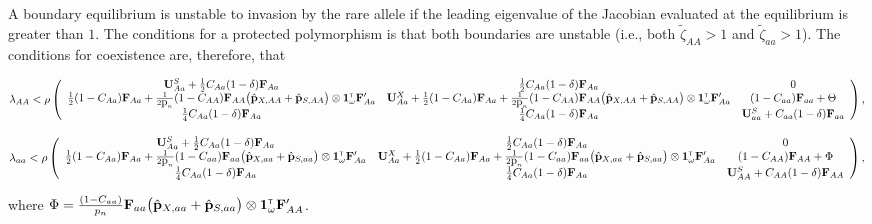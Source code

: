 \documentclass[11pt]{article}
\def\mbf#1{\mathbf{#1}}
\newcommand{\tr}{{\mbox{\tiny \sf T}}}
\begin{document}
\begin{landscape}
A boundary equilibrium is unstable to invasion by the rare allele if the leading eigenvalue of the Jacobian evaluated at the equilibrium is greater than $1$. The conditions for a protected polymorphism is that both boundaries are unstable (i.e., both $\tilde{\zeta}_{AA} > 1$ and $\tilde{\zeta}_{aa} > 1$). The conditions for coexistence are, therefore, that


{\footnotesize
\begin{equation} \label{eq:coexist_AA}
	\lambda_{AA} < 
			\rho\left(\begin{array}{ccc}
\mathbf{U}^S_{Aa} +\frac{1}{2} C_{Aa} (1 - \delta) \mbf{F}_{Aa} & \frac{1}{2} C_{Aa} (1 - \delta) \mbf{F}_{Aa}  & 0 \\
 \frac{1}{2} (1 - C_{Aa}) \mbf{F}_{Aa}+\frac{1}{2  \mbox{p}_{n}} (1 - C_{AA})\mbf{F}_{AA} \big(\hat{\mbf{p}}_{X,AA}+ \hat{\mbf{p}}_{S,AA}  \big) \otimes \mathbf{1}^\tr_{\omega} \mathbf{F}_{Aa}^\prime &\mathbf{U}^X_{Aa} + \frac{1}{2} (1 - C_{Aa}) \mbf{F}_{Aa} +\frac{1}{2  \mbox{p}_{n}} (1 - C_{AA})\mbf{F}_{AA} \big(\hat{\mbf{p}}_{X,AA}+ \hat{\mbf{p}}_{S,AA}  \big) \otimes \mathbf{1}^\tr_{\omega} \mathbf{F}_{Aa}^\prime & (1-C_{aa})\mbf{F}_{aa} + \Theta\\
  \frac{1}{4} C_{Aa} (1 - \delta) \mbf{F}_{Aa} & \frac{1}{4} C_{Aa} (1 - \delta) \mbf{F}_{Aa}  &\mathbf{U}^S_{aa} +C_{aa} (1 - \delta) \mbf{F}_{aa}  \\ 
			\end{array} \right), \\ 
\end{equation} 


\begin{equation} \label{eq:coexist_aa}
	\lambda_{aa} < 
			\rho\left(\begin{array}{ccc}
\mathbf{U}^S_{Aa} +\frac{1}{2} C_{Aa} (1 - \delta) \mbf{F}_{Aa} & \frac{1}{2} C_{Aa} (1 - \delta) \mbf{F}_{Aa}  & 0 \\
 \frac{1}{2} (1 - C_{Aa}) \mbf{F}_{Aa}+\frac{1}{2  \mbox{p}_{n}} (1 - C_{aa})\mbf{F}_{aa} \big(\hat{\mbf{p}}_{X,aa}+ \hat{\mbf{p}}_{S,aa}  \big) \otimes \mathbf{1}^\tr_{\omega} \mathbf{F}_{Aa}^\prime &\mathbf{U}^X_{Aa} + \frac{1}{2} (1 - C_{Aa}) \mbf{F}_{Aa} +\frac{1}{2  \mbox{p}_{n}} (1 - C_{aa})\mbf{F}_{aa} \big(\hat{\mbf{p}}_{X,aa}+ \hat{\mbf{p}}_{S,aa}  \big) \otimes \mathbf{1}^\tr_{\omega} \mathbf{F}_{Aa}^\prime & (1-C_{AA})\mbf{F}_{AA} + \Phi\\
  \frac{1}{4} C_{Aa} (1 - \delta) \mbf{F}_{Aa} & \frac{1}{4} C_{Aa} (1 - \delta) \mbf{F}_{Aa}  &\mathbf{U}^S_{AA} + C_{AA} (1 - \delta) \mbf{F}_{AA}  \\ 
			\end{array} \right), \\ 
\end{equation} 
}

where $\Phi = \frac{(1 - C_{aa})}{p_{n}} \mbf{F}_{aa} \big(\hat{\mbf{p}}_{X,aa}+ \hat{\mbf{p}}_{S,aa}  \big) \otimes \mathbf{1}^\tr_{\omega} \mathbf{F}_{AA}^\prime$.

\end{landscape}
\end{document}
